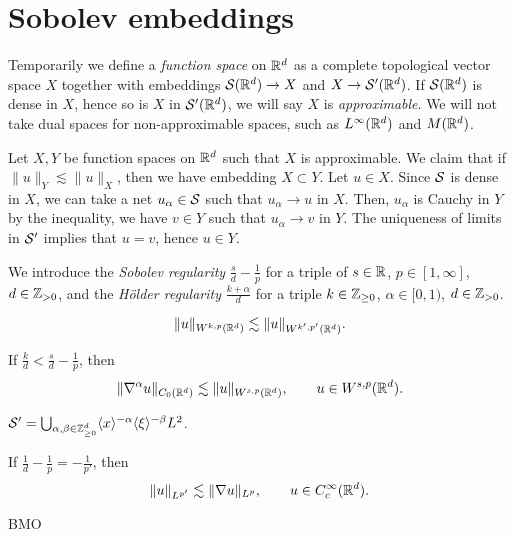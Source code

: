 \documentclass{../../large}
\begin{document}
\section{Sobolev embeddings}

Temporarily we define a \emph{function space} on $\mathbb{R}^d$ as a complete topological vector space $X$ together with embeddings $\mathcal{S}(\mathbb{R}^d)\to X$ and $X\to\mathcal{S}'(\mathbb{R}^d)$.
If $\mathcal{S}(\mathbb{R}^d)$ is dense in $X$, hence so is $X$ in $\mathcal{S}'(\mathbb{R}^d)$, we will say $X$ is \emph{approximable}.
We will not take dual spaces for non-approximable spaces, such as $L^\infty(\mathbb{R}^d)$ and $M(\mathbb{R}^d)$.

Let $X,Y$ be function spaces on $\mathbb{R}^d$ such that $X$ is approximable.
We claim that if $\|u\|_Y\lesssim\|u\|_X$, then we have embedding $X\subset Y$.
Let $u\in X$.
Since $\mathcal{S}$ is dense in $X$, we can take a net $u_\alpha\in\mathcal{S}$ such that $u_\alpha\to u$ in $X$.
Then, $u_\alpha$ is Cauchy in $Y$ by the inequality, we have $v\in Y$ such that $u_\alpha\to v$ in $Y$.
The uniqueness of limits in $\mathcal{S}'$ implies that $u=v$, hence $u\in Y$.

\begin{prb}
We introduce the \emph{Sobolev regularity} $\frac sd-\frac1p$ for a triple of $s\in\mathbb{R}$, $p\in[1,\infty]$, $d\in\mathbb{Z}_{>0}$, and the \emph{H\"older regularity} $\frac{k+\alpha}d$ for a triple $k\in\mathbb{Z}_{\ge0}$, $\alpha\in[0,1)$, $d\in\mathbb{Z}_{>0}$.
\begin{parts}
\item
\[\|u\|_{W^{k,p}(\mathbb{R}^d)}\lesssim\|u\|_{W^{k',p'}(\mathbb{R}^d)}.\]
\item If $\frac kd<\frac sd-\frac1p$, then
\[\|\nabla^\alpha u\|_{C_0(\mathbb{R}^d)}\lesssim\|u\|_{W^{s,p}(\mathbb{R}^d)},\qquad u\in W^{s,p}(\mathbb{R}^d).\]
\end{parts}
\end{prb}

$\mathcal{S}'=\bigcup_{\alpha,\beta\in\mathbb{Z}_{\ge0}^d}\langle x\rangle^{-\alpha}\langle\xi\rangle^{-\beta}L^2$.


\begin{prb}
If $\frac1d-\frac1p=-\frac1{p'}$, then
\[\|u\|_{L^{p'}}\lesssim\|\nabla u\|_{L^p},\qquad u\in C_c^\infty(\mathbb{R}^d).\]
\end{prb}
\begin{prb}
\end{prb}
\begin{prb}
\end{prb}
\begin{prb} BMO
\end{prb}
\end{document}
